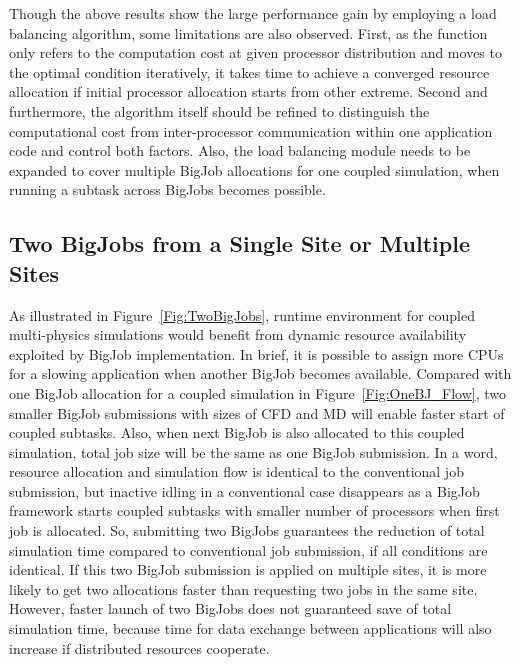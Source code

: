 \documentclass[conference,final]{IEEEtran}
\begin{document}
Though the above results show the large performance gain by employing a load balancing algorithm, some limitations are also observed. First, as the function only refers to the computation cost at given processor distribution and moves to the optimal condition iteratively, it takes time to achieve a converged resource allocation if initial processor allocation starts from other extreme. Second and furthermore, the algorithm itself should be refined to distinguish the computational cost from inter-processor communication within one application code and control both factors. Also, the load balancing module needs to be expanded to cover multiple BigJob allocations for one coupled simulation, when running a subtask across BigJobs becomes possible.


\subsection{Two BigJobs from a Single Site or Multiple Sites}


As illustrated in Figure~\ref{Fig:TwoBigJobs}, runtime environment for coupled multi-physics simulations would benefit from dynamic resource availability exploited by BigJob implementation. In brief, it is possible to assign more CPUs for a slowing application when another BigJob becomes available. Compared with one BigJob allocation for a coupled simulation in Figure~\ref{Fig:OneBJ_Flow}, two smaller BigJob submissions with sizes of CFD and MD will enable faster start of coupled subtasks. Also, when next BigJob is also allocated to this coupled simulation, total job size will be the same as one BigJob submission. In a word, resource allocation and simulation flow is identical to the conventional job submission, but inactive idling in a conventional case disappears as a BigJob framework starts coupled subtasks with smaller number of processors when first job is allocated. So, submitting two BigJobs guarantees the reduction of total simulation time compared to conventional job submission, if all conditions are identical. If this two BigJob submission is applied on multiple sites, it is more likely to get two allocations faster than requesting two jobs in the same site. However, faster launch of two BigJobs does not guaranteed save of total simulation time, because time for data exchange between applications will also increase if distributed resources cooperate.
\end{document}
